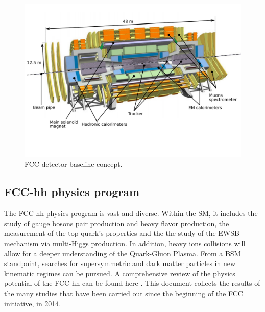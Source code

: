 \begin{figure}
	\centering
	\includegraphics[trim={0 4cm 0.5cm 0},clip,width=\textwidth]{./Figures/FCCsvg1.png}
	\caption{FCC detector baseline concept.}
	\label{fig:FCC_detector}
\end{figure} 


\subsection{FCC-hh physics program}

The FCC-hh physics program is vast and diverse. Within the SM, it includes the study of gauge bosons pair production and heavy flavor production, the measurement of the top quark's properties and the the study of the EWSB mechanism via multi-Higgs production. In addition, heavy ions collisions will allow for a deeper understanding of the Quark-Gluon Plasma. From a BSM standpoint, searches for supersymmetric and dark matter particles in new kinematic regimes can be pursued. A comprehensive review of the physics potential of the FCC-hh can be found here \cite{FCCyellow}. This document collects the results of the many studies that have been carried out since the beginning of the FCC initiative, in 2014.

